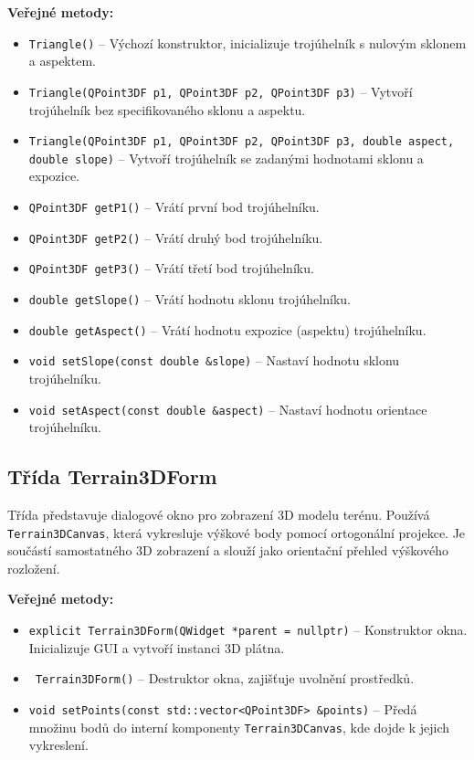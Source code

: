 \textbf{Veřejné metody:}
\begin{itemize}
\item \texttt{Triangle()} – Výchozí konstruktor, inicializuje trojúhelník s nulovým sklonem a aspektem.
\item \texttt{Triangle(QPoint3DF p1, QPoint3DF p2, QPoint3DF p3)} – Vytvoří trojúhelník bez specifikovaného sklonu a aspektu.
\item \texttt{Triangle(QPoint3DF p1, QPoint3DF p2, QPoint3DF p3, double aspect, double slope)} – Vytvoří trojúhelník se zadanými hodnotami sklonu a expozice.
\item \texttt{QPoint3DF getP1()} – Vrátí první bod trojúhelníku.
\item \texttt{QPoint3DF getP2()} – Vrátí druhý bod trojúhelníku.
\item \texttt{QPoint3DF getP3()} – Vrátí třetí bod trojúhelníku.
\item \texttt{double getSlope()} – Vrátí hodnotu sklonu trojúhelníku.
\item \texttt{double getAspect()} – Vrátí hodnotu expozice (aspektu) trojúhelníku.
\item \texttt{void setSlope(const double \&slope)} – Nastaví hodnotu sklonu trojúhelníku.
\item \texttt{void setAspect(const double \&aspect)} – Nastaví hodnotu orientace trojúhelníku.
\end{itemize}

\subsection{Třída Terrain3DForm}
Třída představuje dialogové okno pro zobrazení 3D modelu terénu. Používá \texttt{Terrain3DCanvas}, která vykresluje výškové body pomocí ortogonální projekce. Je součástí samostatného 3D zobrazení a slouží jako orientační přehled výškového rozložení.

\textbf{Veřejné metody:}
\begin{itemize}
    \item \texttt{explicit Terrain3DForm(QWidget *parent = nullptr)} – Konstruktor okna. Inicializuje GUI a vytvoří instanci 3D plátna.
    \item \texttt{~Terrain3DForm()} – Destruktor okna, zajišťuje uvolnění prostředků.
    \item \texttt{void setPoints(const std::vector<QPoint3DF> \&points)} – Předá množinu bodů do interní komponenty \texttt{Terrain3DCanvas}, kde dojde k jejich vykreslení.
\end{itemize}


